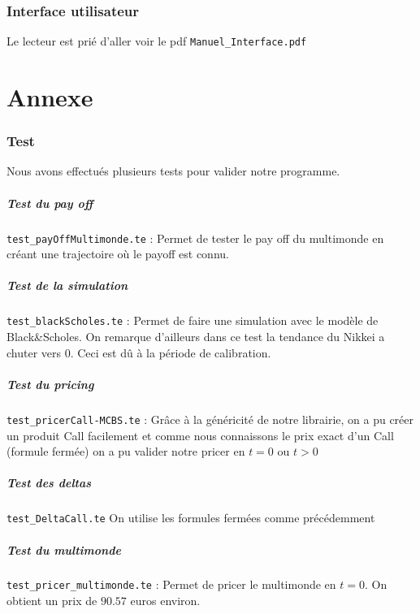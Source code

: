 \documentclass[a4paper,12pt]{article}
\begin{document}
\section{Interface utilisateur}
Le lecteur est prié d'aller voir le pdf {\tt Manuel\_Interface.pdf}
\newpage
\part{Annexe}
\section{Test}
Nous avons effectués plusieurs tests pour valider notre programme. 
\subsubsection*{Test du pay off}
{\tt test\_payOffMultimonde.te} : Permet de tester le pay off du multimonde en créant une trajectoire où le payoff est connu.
\subsubsection*{Test de la simulation}
{\tt test\_blackScholes.te} : Permet de faire une simulation avec le modèle de Black\&Scholes. On remarque d'ailleurs dans ce test la tendance du Nikkei a chuter vers $0$. Ceci est dû à la période de calibration.
\subsubsection*{Test du pricing}
{\tt test\_pricerCall-MCBS.te} : Grâce à la généricité de notre librairie, on a pu créer un produit Call facilement et comme nous connaissons le prix exact d'un Call (formule fermée) on a pu valider notre pricer en $t=0$ ou $t>0$
\subsubsection*{Test des deltas}
{\tt test\_DeltaCall.te} On utilise les formules fermées comme précédemment
\subsubsection*{Test du multimonde}
{\tt test\_pricer\_multimonde.te} : Permet de pricer le multimonde en $t=0$. On obtient un prix de $90.57$ euros environ. \\
\end{document}
